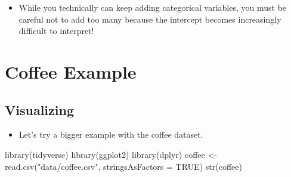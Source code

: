 \documentclass[
  letterpaper,
  DIV=11,
  numbers=noendperiod]{scrreprt}
\newenvironment{Shaded}{\begin{snugshade}}{\end{snugshade}}
\newcommand{\AttributeTok}[1]{\textcolor[rgb]{0.40,0.45,0.13}{#1}}
\newcommand{\ConstantTok}[1]{\textcolor[rgb]{0.56,0.35,0.01}{#1}}
\newcommand{\FunctionTok}[1]{\textcolor[rgb]{0.28,0.35,0.67}{#1}}
\newcommand{\NormalTok}[1]{\textcolor[rgb]{0.00,0.23,0.31}{#1}}
\newcommand{\OtherTok}[1]{\textcolor[rgb]{0.00,0.23,0.31}{#1}}
\newcommand{\StringTok}[1]{\textcolor[rgb]{0.13,0.47,0.30}{#1}}
\providecommand{\tightlist}{%
  \setlength{\itemsep}{0pt}\setlength{\parskip}{0pt}}\usepackage{longtable,booktabs,array}
\begin{document}
\begin{itemize}
\tightlist
\item
  While you technically can keep adding categorical variables, you must
  be careful not to add too many because the intercept becomes
  increasingly difficult to interpret!
\end{itemize}

\section{Coffee Example}\label{coffee-example}

\subsection{Visualizing}\label{visualizing}

\begin{itemize}
\tightlist
\item
  Let's try a bigger example with the coffee dataset.
\end{itemize}

\begin{Shaded}
\begin{Highlighting}[]
\FunctionTok{library}\NormalTok{(tidyverse)}
\FunctionTok{library}\NormalTok{(ggplot2)}
\FunctionTok{library}\NormalTok{(dplyr)}
\NormalTok{coffee }\OtherTok{\textless{}{-}} \FunctionTok{read.csv}\NormalTok{(}\StringTok{"data/coffee.csv"}\NormalTok{, }\AttributeTok{stringsAsFactors =} \ConstantTok{TRUE}\NormalTok{)}
\FunctionTok{str}\NormalTok{(coffee)}
\end{Highlighting}
\end{Shaded}
\end{document}
